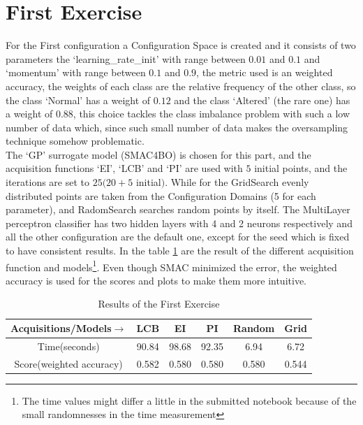 \documentclass[12pt, onecolumn]{article}
\begin{document}
\section*{First Exercise}
For the First configuration a Configuration Space is created and it consists of two parameters the `learning\_rate\_init' with range between $0.01$ and $0.1$ and `momentum'  with range between $0.1$ and $0.9$, the metric used is an weighted accuracy, the weights of each class are the relative frequency of the other class, so the class `Normal' has a weight of $0.12$ and the class `Altered' (the rare one) has a weight of $0.88$, this choice tackles the class imbalance problem with such a low number of data which, since such small number of data makes the oversampling technique somehow problematic.\\
The `GP' surrogate model (SMAC4BO) is chosen for this part, and the acquisition functions `EI', `LCB' and `PI' are used with $5$ initial points, and the iterations are set to $25 (20 + 5$ initial$)$.
While for the GridSearch evenly distributed points are taken from the Configuration Domains (5 for each parameter), and RadomSearch searches random points by itself.
The MultiLayer perceptron classifier has two hidden layers with 4 and 2 neurons respectively and all the other configuration are the default one, except for the seed which is fixed to have consistent results. 
In the table \ref{tab:Ex1_res} are the result of the different acquisition function and models\footnote{The time values might differ a little in the submitted notebook because of the small randomnesses in the time measurement}.
Even though SMAC minimized the error, the weighted accuracy is used for the scores and plots to make them more intuitive.

\begin{table}[!h]
  \centering
  \begin{tabular}{ |c|c|c|c|c|c| } 
    \hline
    Acquisitions/Models$\to$ & LCB  & EI & PI & Random & Grid \\
    \hline
    Time(seconds) & 90.84 & 98.68 & 92.35 & 6.94 & 6.72\\
    \hline
    Score(weighted accuracy) & 0.582 & 0.580 & 0.580 & 0.580 & 0.544\\ 
    \hline
  \end{tabular}
  \caption{Results of the First Exercise}
  \label{tab:Ex1_res}
\end{table}
\end{document}
